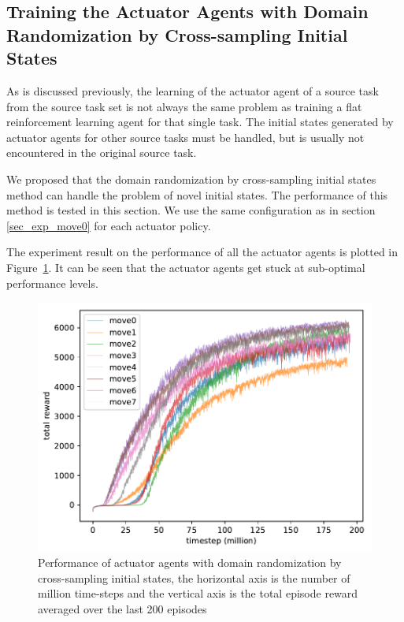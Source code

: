 \subsection{Training the Actuator Agents with Domain Randomization by Cross-sampling Initial States}
As is discussed previously, the learning of the actuator agent of a source task from the source task set is not always the same problem as training a flat reinforcement learning agent for that single task. The initial states generated by actuator agents for other source tasks must be handled, but is usually not encountered in the original source task.

We proposed that the domain randomization by cross-sampling initial states method can handle the problem of novel initial states. The performance of this method is tested in this section. We use the same configuration as in section \ref{sec_exp_move0} for each actuator policy.  

The experiment result on the performance of all the actuator agents is plotted in Figure~\ref{rec_8task_training}. It can be seen that the actuator agents get stuck at sub-optimal performance levels. 

\begin{figure}[!htbp]
	\includegraphics[width=\textwidth]{images/rec_180617_joint8.pdf}
	\centering
	\caption{Performance of actuator agents with domain randomization by cross-sampling initial states, the horizontal axis is the number of million time-steps and the vertical axis is the total episode reward averaged over the last 200 episodes}\label{rec_8task_training}
\end{figure}

